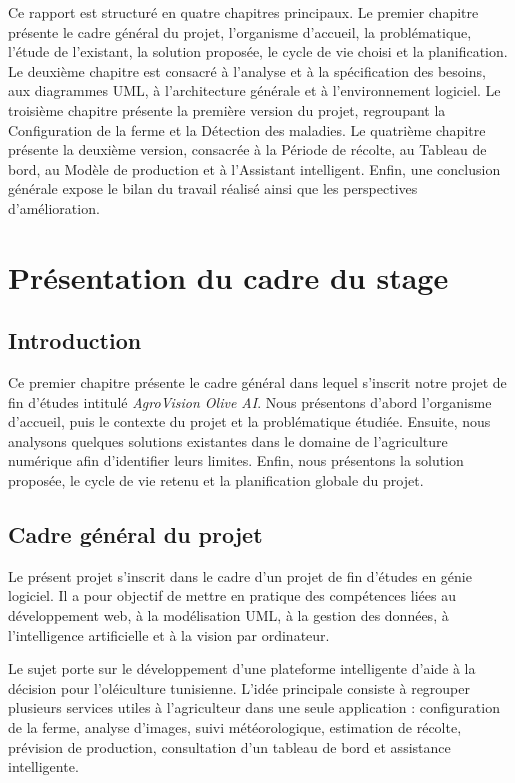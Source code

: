 \documentclass[12pt,a4paper]{report}
\begin{document}
Ce rapport est structuré en quatre chapitres principaux. Le premier chapitre présente le cadre général du projet, l'organisme d'accueil, la problématique, l'étude de l'existant, la solution proposée, le cycle de vie choisi et la planification. Le deuxième chapitre est consacré à l'analyse et à la spécification des besoins, aux diagrammes UML, à l'architecture générale et à l'environnement logiciel. Le troisième chapitre présente la première version du projet, regroupant la Configuration de la ferme et la Détection des maladies. Le quatrième chapitre présente la deuxième version, consacrée à la Période de récolte, au Tableau de bord, au Modèle de production et à l'Assistant intelligent. Enfin, une conclusion générale expose le bilan du travail réalisé ainsi que les perspectives d'amélioration.

\chapter{Présentation du cadre du stage}

\section{Introduction}

Ce premier chapitre présente le cadre général dans lequel s'inscrit notre projet de fin d'études intitulé \textit{AgroVision Olive AI}. Nous présentons d'abord l'organisme d'accueil, puis le contexte du projet et la problématique étudiée. Ensuite, nous analysons quelques solutions existantes dans le domaine de l'agriculture numérique afin d'identifier leurs limites. Enfin, nous présentons la solution proposée, le cycle de vie retenu et la planification globale du projet.

\section{Cadre général du projet}

Le présent projet s'inscrit dans le cadre d'un projet de fin d'études en génie logiciel. Il a pour objectif de mettre en pratique des compétences liées au développement web, à la modélisation UML, à la gestion des données, à l'intelligence artificielle et à la vision par ordinateur.

Le sujet porte sur le développement d'une plateforme intelligente d'aide à la décision pour l'oléiculture tunisienne. L'idée principale consiste à regrouper plusieurs services utiles à l'agriculteur dans une seule application : configuration de la ferme, analyse d'images, suivi météorologique, estimation de récolte, prévision de production, consultation d'un tableau de bord et assistance intelligente.
\end{document}
